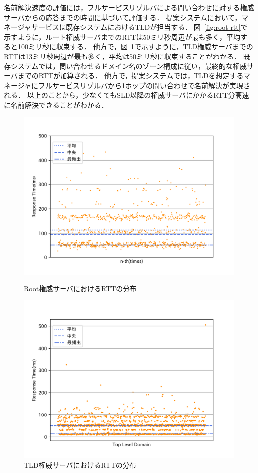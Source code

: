 名前解決速度の評価には，フルサービスリゾルバによる問い合わせに対する権威サーバからの応答までの時間に基づいて評価する．
提案システムにおいて，マネージャサービスは既存システムにおけるTLDが担当する．
図~\ref{fig:root-rtt}で示すように，ルート権威サーバまでのRTTは50ミリ秒周辺が最も多く，平均すると100ミリ秒に収束する．
他方で，図~\ref{fig:tld-rtt}で示すように，TLD権威サーバまでのRTTは13ミリ秒周辺が最も多く，平均は50ミリ秒に収束することがわかる．
既存システムでは，問い合わせるドメイン名のゾーン構成に従い，最終的な権威サーバまでのRTTが加算される．
他方で，提案システムでは，TLDを想定するマネージャにフルサービスリゾルバから1ホップの問い合わせで名前解決が実現される．
以上のことから，少なくてもSLD以降の権威サーバにかかるRTT分高速に名前解決できることがわかる．
\begin{figure}[htbp]
 \centering
 \includegraphics[scale=0.4]{figure/root-rtt.png}
 \vspace{-0.5cm}
 \caption{Root権威サーバにおけるRTTの分布}
 \label{fig:root-rtt}
 \includegraphics[scale=0.4]{figure/average_rtt.png}
 \vspace{-0.5cm}
 \caption{TLD権威サーバにおけるRTTの分布}
 \label{fig:tld-rtt}
\end{figure}

